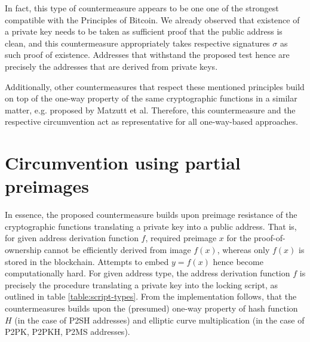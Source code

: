 \documentclass[a4paper,11pt,titlepage]{scrbook}
\begin{document}
In fact, this type of countermeasure appears to be one one of the strongest compatible with the Principles of Bitcoin.
We already observed that existence of a private key needs to be taken as sufficient proof that the public address is clean,
and this countermeasure appropriately takes respective signatures $\sigma$ as such proof of existence.
Addresses that withstand the proposed test hence are precisely the addresses that are derived from private keys.

Additionally, other countermeasures that respect these mentioned principles build on top of the one-way property of the same cryptographic functions in a similar matter, e.g.\@ {} proposed by Matzutt et al. \cite[sec.~IV.D]{matzutt_thwarting_2018}
Therefore, this countermeasure and the respective circumvention act as representative for all one-way-based approaches.

\section{Circumvention using partial preimages}


In essence, the proposed countermeasure builds upon preimage resistance of the cryptographic functions translating a private key into a public address. %
That is, for given address derivation function $f$, required preimage $x$ for the proof-of-ownership cannot be efficiently derived from image $f(x)$, whereas only $f(x)$ is stored in the blockchain.
Attempts to embed $y=f(x)$ hence become computationally hard.
For given address type, the address derivation function $f$ is precisely the procedure translating a private key into the locking script, as outlined in table \ref{table:script-types}.
%
From the implementation follows, that the countermeasures builds upon the (presumed) one-way property of hash function $H$ (in the case of P2SH addresses) and elliptic curve multiplication (in the case of P2PK, P2PKH, P2MS addresses).
\end{document}

